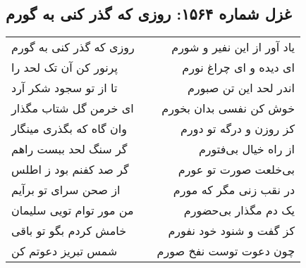 \begin{center}
\section*{غزل شماره ۱۵۶۴: روزی که گذر کنی به گورم}
\label{sec:1564}
\begin{longtable}{l p{0.5cm} r}
روزی که گذر کنی به گورم
&&
یاد آور از این نفیر و شورم
\\
پرنور کن آن تک لحد را
&&
ای دیده و ای چراغ نورم
\\
تا از تو سجود شکر آرد
&&
اندر لحد این تن صبورم
\\
ای خرمن گل شتاب مگذار
&&
خوش کن نفسی بدان بخورم
\\
وان گاه که بگذری مینگار
&&
کز روزن و درگه تو دورم
\\
گر سنگ لحد ببست راهم
&&
از راه خیال بی‌فتورم
\\
گر صد کفنم بود ز اطلس
&&
بی‌خلعت صورت تو عورم
\\
از صحن سرای تو برآیم
&&
در نقب زنی مگر که مورم
\\
من مور توام تویی سلیمان
&&
یک دم مگذار بی‌حضورم
\\
خامش کردم بگو تو باقی
&&
کز گفت و شنود خود نفورم
\\
شمس تبریز دعوتم کن
&&
چون دعوت توست نفخ صورم
\\
\end{longtable}
\end{center}
